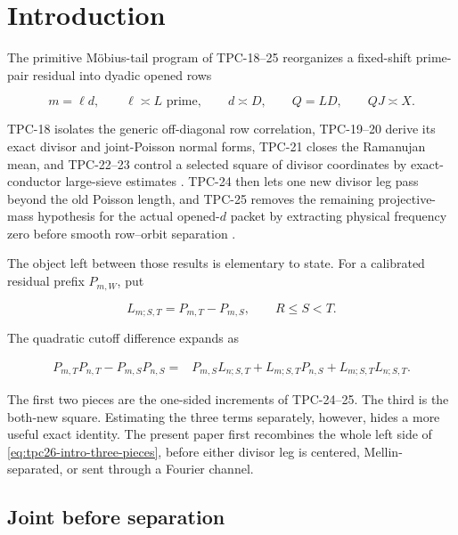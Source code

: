 \section{Introduction}
\label{sec:tpc26-introduction}

The primitive M\"obius-tail program of TPC-18--25 reorganizes a
fixed-shift prime-pair residual into dyadic opened rows

\[
 m=\ell d,
 \qquad \ell\asymp L\text{ prime},
 \qquad d\asymp D,
 \qquad Q=LD,
 \qquad QJ\asymp X.
\]

TPC-18 isolates the generic off-diagonal row correlation, TPC-19--20
derive its exact divisor and joint-Poisson normal forms, TPC-21 closes
the Ramanujan mean, and TPC-22--23 control a selected square of divisor
coordinates by exact-conductor large-sieve estimates
\citep{WangTPC18,WangTPC19,WangTPC20,WangTPC21,WangTPC22,WangTPC23}.
TPC-24 then lets one new divisor leg pass beyond the old Poisson length,
and TPC-25 removes the remaining projective-mass hypothesis for the
actual opened-\(d\) packet by extracting physical frequency zero before
smooth row--orbit separation \citep{WangTPC24,WangTPC25}.

The object left between those results is elementary to state.  For a
calibrated residual prefix \(P_{m,W}\), put

\begin{equation}
 L_{m;S,T}=P_{m,T}-P_{m,S},
 \qquad R\le S<T.
 \label{eq:tpc26-intro-L}
\end{equation}

The quadratic cutoff difference expands as

\begin{align}
 P_{m,T}P_{n,T}-P_{m,S}P_{n,S}
 ={}&P_{m,S}L_{n;S,T}
 +L_{m;S,T}P_{n,S}
 +L_{m;S,T}L_{n;S,T}.
 \label{eq:tpc26-intro-three-pieces}
\end{align}

The first two pieces are the one-sided increments of TPC-24--25.  The
third is the both-new square.  Estimating the three terms separately,
however, hides a more useful exact identity.  The present paper first
recombines the whole left side of
\eqref{eq:tpc26-intro-three-pieces}, before either divisor leg is
centered, Mellin-separated, or sent through a Fourier channel.

\subsection{Joint before separation}


